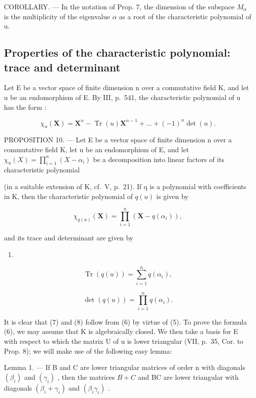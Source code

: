 COROLLARY. --- In the notation of Prop. 7, the dimension of the subspace \(M_{\alpha}\) is the multiplicity of the eigenvalue \(\alpha\) as a root of the characteristic polynomial of u.

\subsection{Properties of the characteristic polynomial: trace and determinant}

Let E be a vector space of finite dimension n over a commutative field K, and let u be an endomorphism of E. By III, p.~541, the characteristic polynomial of u has the form :

\[
\chi_ {u} (\mathbf {X}) = \mathbf {X} ^ {n} - \operatorname{Tr} (u) \mathbf {X} ^ {n - 1} + \dots + (- 1) ^ {n} \det (u).\tag{5}
\]

PROPOSITION 10. --- Let E be a vector space of finite dimension n over a commutative field K, let u be an endomorphism of E, and let \(\chi_u(X) = \prod_{i=1}^{n}(X - \alpha_i)\) be a decomposition into linear factors of its characteristic polynomial

(in a suitable extension of K, cf.~V, p.~21). If q is a polynomial with coefficients in K, then the characteristic polynomial of \(q(u)\) is given by

\[
\chi_ {q (u)} (\mathbf {X}) = \prod_ {i = 1} ^ {n} \left(\mathbf {X} - q \left(\alpha_ {i}\right)\right),\tag{6}
\]

and its trace and determinant are given by

\begin{enumerate}
\def\labelenumi{(\arabic{enumi})}
\setcounter{enumi}{6}
\tightlist
\item
\end{enumerate}

\[
\operatorname{Tr} (q (u)) = \sum_ {i = 1} ^ {n} q (\alpha_ {i}),\tag{8}
\]

\[
\det (q (u)) = \prod_ {i = 1} ^ {n} q (\alpha_ {i}).
\]

It is clear that (7) and (8) follow from (6) by virtue of (5). To prove the formula (6), we may assume that K is algebraically closed. We then take a basis for E with respect to which the matrix U of u is lower triangular (VII, p.~35, Cor. to Prop. 8); we will make use of the following easy lemma:

Lemma 1. --- If B and C are lower triangular matrices of order n with diagonals \((\beta_{i})\) and \((\gamma_{i})\) , then the matrices \(B + C\) and BC are lower triangular with diagonals \((\beta_{i} + \gamma_{i})\) and \((\beta_{i}\gamma_{i})\) .

